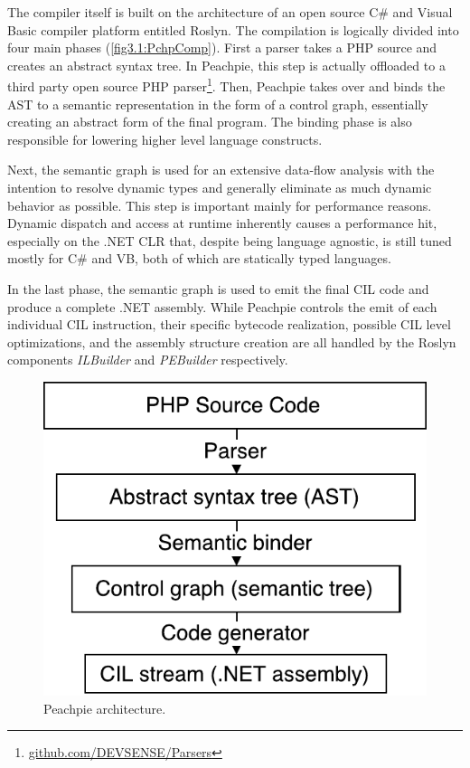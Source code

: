 The compiler itself is built on the architecture of an open source C\# and Visual Basic compiler platform entitled Roslyn. The compilation is logically divided into four main phases (\autoref{fig3.1:PchpComp}). First a parser takes a PHP source and creates an abstract syntax tree. In Peachpie, this step is actually offloaded to a third party open source PHP parser\footnote{\href{https://github.com/DEVSENSE/Parsers}{github.com/DEVSENSE/Parsers}}. Then, Peachpie takes over and binds the AST to a semantic representation in the form of a control graph, essentially creating an abstract form of the final program. The binding phase is also responsible for lowering higher level language constructs.

Next, the semantic graph is used for an extensive data-flow analysis with the intention to resolve dynamic types and generally eliminate as much dynamic behavior as possible. This step is important mainly for performance reasons. Dynamic dispatch and access at runtime inherently causes a performance hit, especially on the .NET CLR that, despite being language agnostic, is still tuned mostly for C\# and VB, both of which are statically typed languages.

In the last phase, the semantic graph is used to emit the final CIL code and produce a complete .NET assembly. While Peachpie controls the emit of each individual CIL instruction, their specific bytecode realization, possible CIL level optimizations, and the assembly structure creation are all handled by the Roslyn components \emph{ILBuilder} and \emph{PEBuilder} respectively.

\begin{figure}[h]
	\centering	
	\includegraphics[scale=0.75]{../img/3_1_Peachpie}	
	\caption{Peachpie architecture.}
	\label{fig3.1:PchpComp}
\end{figure}

